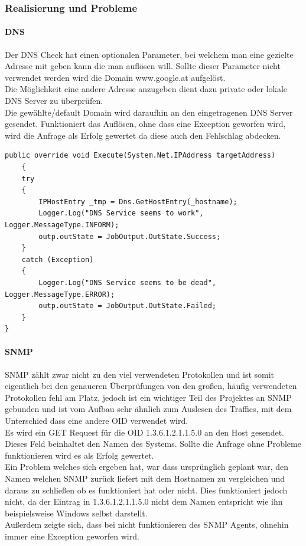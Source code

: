\documentclass[12pt,a4paper]{report}
\begin{document}
\begin{onehalfspace}
\subsubsection{Realisierung und Probleme}
\paragraph{DNS}
Der DNS Check hat einen optionalen Parameter, bei welchem man eine gezielte Adresse mit geben kann die man auflösen will. Sollte dieser Parameter nicht verwendet werden wird die Domain www.google.at aufgelöst.\\
Die Möglichkeit eine andere Adresse anzugeben dient dazu private oder lokale DNS Server zu überprüfen.\\
Die gewählte/default Domain wird daraufhin an den eingetragenen DNS Server gesendet. Funktioniert das Auflösen, ohne dass eine Exception geworfen wird, wird die Anfrage als Erfolg gewertet da diese auch den Fehlschlag abdecken.

\begin{lstlisting}
public override void Execute(System.Net.IPAddress targetAddress)
	{
    try
    {
    	IPHostEntry _tmp = Dns.GetHostEntry(_hostname);
        Logger.Log("DNS Service seems to work", Logger.MessageType.INFORM);
        outp.outState = JobOutput.OutState.Success;
    }
    catch (Exception)
    {
    	Logger.Log("DNS Service seems to be dead", Logger.MessageType.ERROR);
        outp.outState = JobOutput.OutState.Failed;
    }
}
\end{lstlisting}

\paragraph{SNMP}
SNMP zählt zwar nicht zu den viel verwendeten Protokollen und ist somit eigentlich bei den genaueren Überprüfungen von den großen, häufig verwendeten Protokollen fehl am Platz, jedoch ist ein wichtiger Teil des Projektes an SNMP gebunden und ist vom Aufbau sehr ähnlich zum Auslesen des Traffics, mit dem Unterschied dass eine andere OID verwendet wird.\\
Es wird ein GET Request für die OID 1.3.6.1.2.1.1.5.0 an den Host gesendet. Dieses Feld beinhaltet den Namen des Systems. Sollte die Anfrage ohne Probleme funktionieren wird es als Erfolg gewertet.\\

Ein Problem welches sich ergeben hat, war dass ursprünglich geplant war, den Namen welchen SNMP zurück liefert mit dem Hostnamen zu vergleichen und daraus zu schließen ob es funktioniert hat oder nicht. Dies funktioniert jedoch nicht, da der Eintrag in 1.3.6.1.2.1.1.5.0 nicht dem Namen entspricht wie ihn beispielsweise Windows selbst darstellt.\\
Außerdem zeigte sich, dass bei nicht funktionieren des SNMP Agents, ohnehin immer eine Exception geworfen wird.


\end{onehalfspace}
\end{document}
